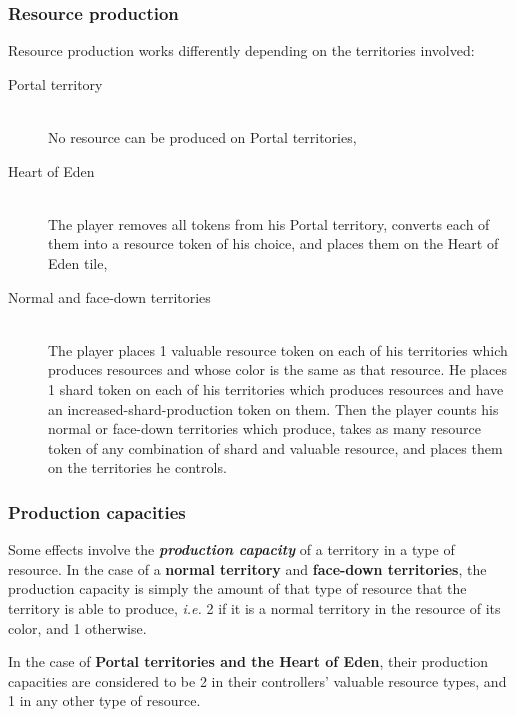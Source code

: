 \documentclass[a4paper]{article}
\begin{document}
    \subsubsection{Resource production}
    \vspace{-1em}
      \hspace{-2em} Resource production works differently depending on the
      territories involved:
      \vspace{-1.3em}
      \begin{description}
          \item[Portal territory] \hfill \\
          No resource can be produced on Portal territories,
          \item[Heart of Eden] \hfill \\
          The player removes all tokens from his Portal territory,
          converts each of them into a resource token of his choice,
          and places them on the Heart of Eden tile,
          \item[Normal and face-down territories] \hfill \\
          The player places 1 valuable resource token on each of his territories
          which produces resources and whose color is the same as that resource.
          He places 1 shard token on each of his territories which produces resources and
          have an increased-shard-production token on them.
          Then the player counts his normal or face-down territories which produce,
          takes as many resource token of any combination of shard and valuable resource,
          and places them on the territories he controls.
      \end{description}

    \subsubsection{Production capacities}
      \vspace{-1em}
      Some effects involve the \textbf{\textit{production capacity}} of
      a territory in a type of resource.
      In the case of a \textbf{normal territory} and \textbf{face-down territories},
      the production capacity is simply the amount of that type of resource that
      the territory is able to produce,
      \textit{i.e.} 2 if it is a normal territory in the resource of its color,
      and 1 otherwise.
      
      In the case of \textbf{Portal territories and the Heart of Eden},
      their production capacities are considered to be 2 in their controllers'
      valuable resource types, and 1 in any other type of resource.
    
\end{document}
